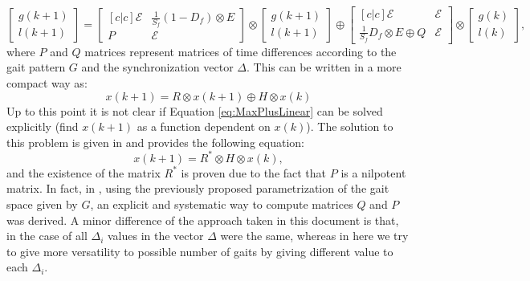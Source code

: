 \documentclass[main.tex]{subfiles}
\begin{document}
\begin{equation}
\begin{bmatrix}
g(k + 1) \\
l(k + 1)
\end{bmatrix} =
\begin{bmatrix}[c|c]
\mathcal{E} & \frac{1}{S_f}(1 - D_f) \otimes E \\ \hline
P & \mathcal{E}
\end{bmatrix} \otimes \begin{bmatrix}
g(k + 1) \\
l(k + 1)
\end{bmatrix} \oplus \begin{bmatrix}[c|c]
\mathcal{E} & \mathcal{E} \\ \hline
\frac{1}{S_f}D_f \otimes E \oplus Q& \mathcal{E}
\end{bmatrix} \otimes \begin{bmatrix}
g(k) \\
l(k)
\end{bmatrix},\label{eq:MaxPlusLinear}
\end{equation}  
where $P$ and $Q$ matrices represent matrices of time differences according to the gait pattern $G$ and the synchronization vector $\Delta$. This can be written in a more compact way as:
\begin{equation*}
x(k+1) = R \otimes x(k+1) \oplus H \otimes x(k)
\end{equation*}
Up to this point it is not clear if Equation \eqref{eq:MaxPlusLinear} can be solved explicitly (find $x(k+1)$ as a function dependent on $x(k)$). The solution to this problem is given in \cite{Lopes2009,Lopes2010} and provides the following equation:
\begin{equation*}
x(k+1) = R^* \otimes H \otimes x(k),
\end{equation*}
and the existence of the matrix $R^*$ is proven due to the fact that $P$ is a nilpotent matrix. In fact, in \cite{Lopes2009}, using the previously proposed parametrization of the gait space given by $G$, an explicit and systematic way to compute matrices $Q$ and $P$ was derived. A minor difference of the approach taken in this document is that, in the case of \cite{Lopes2009} all $\Delta_i$ values in the vector $\Delta$ were the same, whereas in here we try to give more versatility to possible number of gaits by giving different value to each $\Delta_i$.
\end{document}
